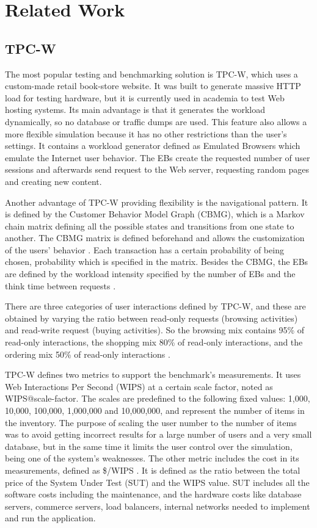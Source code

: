 \chapter{Related Work}
\label{chapter:chapter2}

\section{TPC-W}
\label{sec:tpcw}

The most popular testing and benchmarking solution is TPC-W, which uses a custom-made retail book-store website. It was built to generate massive HTTP load for testing hardware, but it is currently used in academia to test Web hosting systems. Its main advantage is that it generates the workload dynamically, so no database or traffic dumps are used. This feature also allows a more flexible simulation because it has no other restrictions than the user's settings. It contains a workload generator defined as Emulated Browsers which emulate the Internet user behavior. The EBs create the requested number of user sessions and afterwards send request to the Web server, requesting random pages and creating new content. 

Another advantage of TPC-W providing flexibility is the navigational pattern. It is defined by the Customer Behavior Model Graph (CBMG), which is a Markov chain matrix defining all the possible states and transitions from one state to another. The CBMG matrix is defined beforehand and allows the customization of the users' behavior \cite{Menasce}. Each transaction has a certain probability of being chosen, probability which is specified in the matrix. Besides the CBMG, the EBs are defined by the workload intensity specified by the number of EBs and the think time between requests \cite{Pierre}.

There are three categories of user interactions defined by TPC-W, and these are obtained by varying the ratio between read-only requests (browsing activities) and read-write request (buying activities). So the browsing mix contains 95\% of read-only interactions, the shopping mix 80\% of read-only interactions, and the  ordering mix 50\% of  read-only interactions \cite{Amza}.

TPC-W defines two metrics to support the benchmark's measurements. It uses Web Interactions Per Second (WIPS) at a certain scale factor, noted as WIPS@scale-factor. The scales are predefined to the following fixed values: 1,000, 10,000, 100,000, 1,000,000 and 10,000,000, and represent the number of items in the inventory. The purpose of scaling the user number to the number of items was to avoid getting incorrect results for a large number of users and a very small database, but in the same time it limits the user control over the simulation, being one of the system's weaknesses. The other metric includes the cost in its measurements, defined as \$/WIPS \cite{Smith}. It is defined as the ratio between the total price of the System Under Test (SUT) and the WIPS value. SUT includes all the software costs including the maintenance, and the hardware costs like database servers, commerce servers, load balancers, internal networks needed to implement and run the application.

